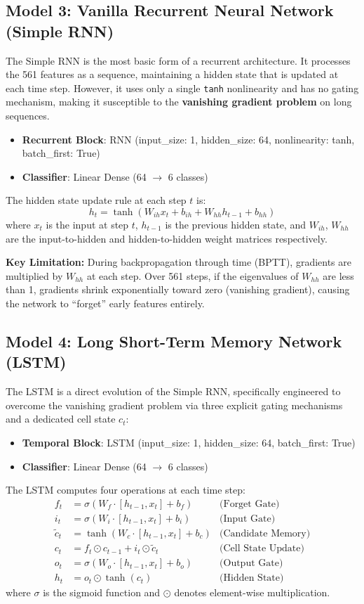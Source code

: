 \documentclass[12pt,a4paper]{article}
\begin{document}
\subsection{Model 3: Vanilla Recurrent Neural Network (Simple RNN)}
The Simple RNN is the most basic form of a recurrent architecture. It processes the 561 features as a sequence, maintaining a hidden state that is updated at each time step. However, it uses only a single \texttt{tanh} nonlinearity and has no gating mechanism, making it susceptible to the \textbf{vanishing gradient problem} on long sequences.
\begin{itemize}
    \item \textbf{Recurrent Block}: RNN (input\_size: 1, hidden\_size: 64, nonlinearity: tanh, batch\_first: True)
    \item \textbf{Classifier}: Linear Dense (64 $\rightarrow$ 6 classes)
\end{itemize}
The hidden state update rule at each step $t$ is:
\[ h_t = \tanh(W_{ih} x_t + b_{ih} + W_{hh} h_{t-1} + b_{hh}) \]
where $x_t$ is the input at step $t$, $h_{t-1}$ is the previous hidden state, and $W_{ih}$, $W_{hh}$ are the input-to-hidden and hidden-to-hidden weight matrices respectively.

\textbf{Key Limitation:} During backpropagation through time (BPTT), gradients are multiplied by $W_{hh}$ at each step. Over 561 steps, if the eigenvalues of $W_{hh}$ are less than 1, gradients shrink exponentially toward zero (vanishing gradient), causing the network to ``forget'' early features entirely.

\subsection{Model 4: Long Short-Term Memory Network (LSTM)}
The LSTM is a direct evolution of the Simple RNN, specifically engineered to overcome the vanishing gradient problem via three explicit gating mechanisms and a dedicated cell state $c_t$:
\begin{itemize}
    \item \textbf{Temporal Block}: LSTM (input\_size: 1, hidden\_size: 64, batch\_first: True)
    \item \textbf{Classifier}: Linear Dense (64 $\rightarrow$ 6 classes)
\end{itemize}
The LSTM computes four operations at each time step:
\begin{align}
    f_t &= \sigma(W_f \cdot [h_{t-1}, x_t] + b_f) & \text{(Forget Gate)} \\
    i_t &= \sigma(W_i \cdot [h_{t-1}, x_t] + b_i) & \text{(Input Gate)} \\
    \tilde{c}_t &= \tanh(W_c \cdot [h_{t-1}, x_t] + b_c) & \text{(Candidate Memory)} \\
    c_t &= f_t \odot c_{t-1} + i_t \odot \tilde{c}_t & \text{(Cell State Update)} \\
    o_t &= \sigma(W_o \cdot [h_{t-1}, x_t] + b_o) & \text{(Output Gate)} \\
    h_t &= o_t \odot \tanh(c_t) & \text{(Hidden State)}
\end{align}
where $\sigma$ is the sigmoid function and $\odot$ denotes element-wise multiplication.
\end{document}

